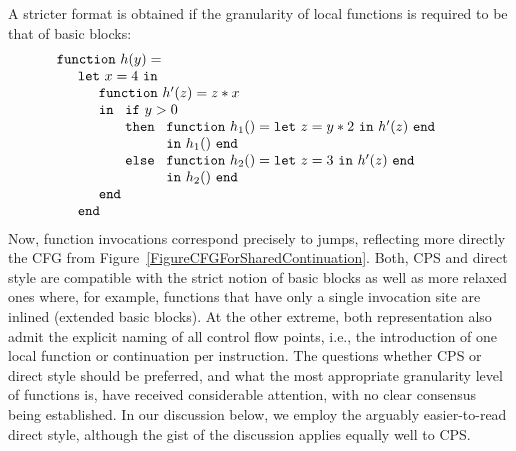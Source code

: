 A stricter format is obtained if the granularity of local functions is
required to be that of basic blocks:
\begin{equation}
\label{DirectStyleCode2}
\begin{array}{l}
\mathtt{function}\ h (y) =\\
\quad
  \begin{array}{l}
    \mathtt{let}\ x=4\ \mathtt{in} \\
    \quad \begin{array}{l}
            \mathtt{function}\ h' (z) = z*x \\
            \mathtt{in}\
                \begin{array}[t]{l}
                  \mathtt{if}\ y>0\\
                  \mathtt{then}\ 
                     \begin{array}[t]{l}
                        \mathtt{function}\ h_1 () = \mathtt{let}\
                              z = y*2\ \mathtt{in}\ h'(z)\ \mathtt{end}\\
                        \mathtt{in}\ h_1()\ \mathtt{end}
                     \end{array}\\
                  \mathtt{else}\ 
                     \begin{array}[t]{l}
                        \mathtt{function}\ h_2 () = \mathtt{let}\
                              z = 3\ \mathtt{in}\ h'(z)\ \mathtt{end}\\
                        \mathtt{in}\ h_2()\ \mathtt{end}
                     \end{array}
                \end{array}\\
            \mathtt{end}
          \end{array} \\
    \mathtt{end}
  \end{array}
\end{array}
\end{equation} 
Now, function invocations correspond precisely to jumps, reflecting
more directly the CFG from
Figure~\ref{FigureCFGForSharedContinuation}.  Both, CPS and direct
style are compatible with the strict notion of basic blocks as well as
more relaxed ones where, for example, functions that have only a
single invocation site are inlined (extended basic blocks). At the
other extreme, both representation also admit the explicit naming of
all control flow points, i.e., the introduction of one local function
or continuation per instruction.  The questions whether CPS or direct
style should be preferred, and what the most appropriate granularity
level of functions is, have received considerable attention, with no
clear consensus being established. In our discussion below, we employ
the arguably easier-to-read direct style, although the gist of the
discussion applies equally well to CPS.

